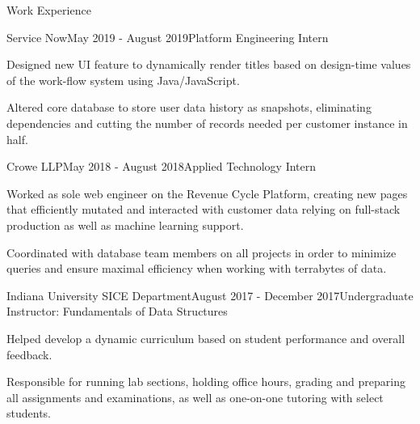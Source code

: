 \documentclass{resume} %
\begin{document}

\begin{rSection}{Work Experience}

	\begin{rSubsection}{Service Now}{May 2019 - August 2019}{Platform Engineering Intern}{}
		\item Designed new UI feature to dynamically render titles based on design-time values of the work-flow system using Java/JavaScript.
		\item Altered core database to store user data history as snapshots, eliminating dependencies and cutting the number of records needed per customer instance in half.
	\end{rSubsection}

	\begin{rSubsection}{Crowe LLP}{May 2018 - August 2018}{Applied Technology Intern}{}
		\item Worked as sole web engineer on the Revenue Cycle Platform, creating new pages that efficiently mutated and interacted with customer data relying on full-stack production as well as machine learning support.
		\item Coordinated with database team members on all projects in order to minimize queries and ensure maximal efficiency when working with terrabytes of data.
	\end{rSubsection}

	\begin{rSubsection}{Indiana University SICE Department}{August 2017 - December 2017}{Undergraduate Instructor: Fundamentals of Data Structures}{}
		\item Helped develop a dynamic curriculum based on student performance and overall feedback.
		\item Responsible for running lab sections, holding office hours, grading and preparing all assignments and examinations, as well as one-on-one tutoring with select students.
	\end{rSubsection}

\end{rSection}
\end{document}
